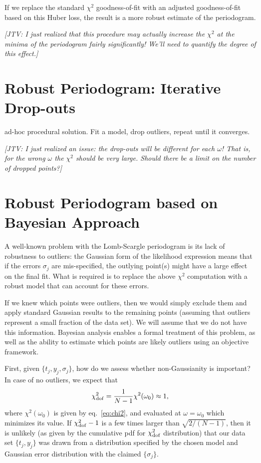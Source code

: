 \documentclass[12pt,pdftex]{article}
\newcommand{\jake}[1]{{\color{blue}\it[JTV: #1]}}
\begin{document}
If we replace the standard $\chi^2$ goodness-of-fit with an adjusted goodness-of-fit based on this Huber loss, the result is a more robust estimate of the periodogram.

\jake{I just realized that this procedure may actually increase the $\chi^2$ at the minima of the periodogram fairly significantly! We'll need to quantify the degree of this effect.}

\section{Robust Periodogram: Iterative Drop-outs}
ad-hoc procedural solution. Fit a model, drop outliers, repeat until it converges.

\jake{I just realized an issue: the drop-outs will be different for each $\omega$! That is, for the wrong $\omega$ the $\chi^2$ should be very large. Should there be a limit on the number of dropped points?}


\section{Robust Periodogram based on Bayesian Approach}

A well-known problem with the Lomb-Scargle periodogram is its lack of robustness to outliers: the Gaussian form of the likelihood expression means that if the errors $\sigma_j$ are mis-specified, the outlying point(s) might have a large effect on the final fit. 
What is required is to replace the above $\chi^2$ computation with a robust model that can account for these errors.

If we knew which points were outliers, then we would simply exclude them and
apply standard Gaussian results to the remaining points (assuming that outliers
represent a small fraction of the data set). We will assume that we do not have this
information. Bayesian analysis enables a formal treatment of this problem, as well 
as the ability to estimate which points are likely outliers using an objective framework.

First, given $\{t_j, y_j, \sigma_j\}$, how do we assess whether non-Gaussianity is important? 
In case of no outliers, we expect that
\begin{equation}
           \chi^2_{\rm dof} = {1 \over N-1} \chi^2(\omega_0) \approx 1,
\end{equation}
where $\chi^2(\omega_0)$ is given by eq.~\ref{eq:chi2}, and evaluated at $\omega=\omega_0$ which
minimizes its value. If $\chi^2_{\rm dof}-1$ is a few times larger than $\sqrt{2/(N-1)}$, then it is unlikely
(as given by the cumulative pdf for $\chi^2_{\rm dof}$ distribution) that our data set $\{t_j, y_j\}$ was 
drawn from a distribution specified by the chosen model and Gaussian error distribution with 
the claimed $\{\sigma_j\}$.
\end{document}
